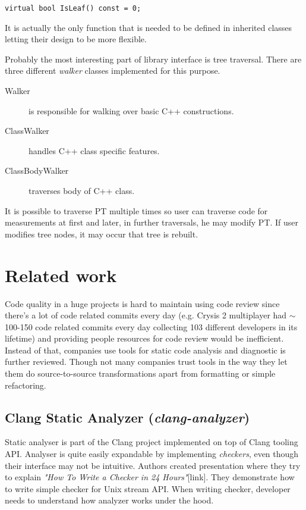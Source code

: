 \begin{lstlisting}
virtual bool IsLeaf() const = 0;
\end{lstlisting}

It is actually the only function that is needed to be defined in inherited classes letting their design to be more flexible.

Probably the most interesting part of library interface is tree traversal. There are three different \emph{walker} classes implemented for this purpose.

\begin{description}
\item[Walker] is responsible for walking over basic C++ constructions.
\item[ClassWalker] handles C++ class specific features.
\item[ClassBodyWalker] traverses body of C++ class.
\end{description}

It is possible to traverse PT multiple times so user can traverse code for measurements at first and later, in further traversals, he may modify PT. If user modifies tree nodes, it may occur that tree is rebuilt.

\section{Related work}
Code quality in a huge projects is hard to maintain using code review since there's a lot of code related commits every day (e.g. Crysis 2 multiplayer had $\sim$100-150 code related commits every day collecting 103 different developers in its lifetime) and providing people resources for code review would be inefficient. Instead of that, companies use tools for static code analysis and diagnostic is further reviewed. Though not many companies trust tools in the way they let them do source-to-source transformations apart from formatting or simple refactoring.

\subsection{Clang Static Analyzer (\emph{clang-analyzer})}
\label{clanganalyzer}
Static analyser is part of the Clang project implemented on top of Clang tooling API. Analyser is quite easily expandable by implementing \emph{checkers}, even though their interface may not be intuitive. Authors created presentation where they try to explain \emph{"How To Write a Checker in 24 Hours"}[link]. They demonstrate how to write simple checker for  Unix stream API. When writing checker, developer needs to understand how analyzer works under the hood.

